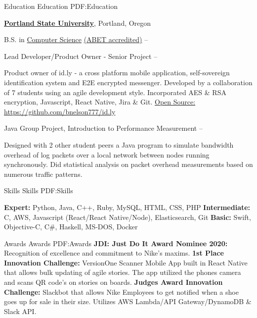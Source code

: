 \documentclass[letterpaper,MMMyyyy,nonstopmode]{simpleresumecv}
\begin{document}
\begin{Body}
		
		
		\Section
		{Education}
		{Education}
		{PDF:Education}
		
		\Entry
		\href{https://www.pdx.edu}
		{\textbf{Portland State University}},
		Portland, Oregon
		
		\Gap
		\BulletItem
		B.S. in
		\href{https://www.pdx.edu/computer-science/}
		{Computer Science} \href{https://www.abet.org}{(ABET accredited)}
		\hfill
		 --
		
		\Gap
		\BulletItem
		Lead Developer/Product Owner - Senior Project 
		\hfill
		 --
		\begin{Detail}
			\SubBulletItem
			Product owner of id.ly - a cross platform mobile application, self-sovereign identification system and E2E encrypted messenger. 
			Developed by a collaboration of 7 students using an agile development style. Incorporated AES \& RSA encryption, Javascript, React Native, Jira \& Git.
			\SubBulletItem
			\href{https://github.com/bnelson777/id.ly}
			{Open Source: https://github.com/bnelson777/id.ly}
		\end{Detail}
		
		\Gap
		\BulletItem
		Java Group Project, Introduction to Performance Measurement
		\hfill
		\DatestampYMD{2017}{04}{15} --
		\DatestampYMD{2017}{06}{15}
		\begin{Detail}
			\SubBulletItem
			Designed with 2 other student peers a Java program to simulate bandwidth overhead of log packets over a local network between nodes running synchronously.
			\SubBulletItem
			Did statistical analysis on packet overhead measurements based on numerous traffic patterns.
		\end{Detail}
		
		
		
		
		\Section
		{Skills}
		{Skills}
		{PDF:Skills}
		
		\Entry
		\textbf{Expert:}
		Python, Java, C++, Ruby, MySQL, HTML, CSS, PHP
		\Entry
		\textbf{Intermediate:}
		C, AWS, Javascript (React/React Native/Node), Elasticsearch, Git
		\Entry
		\textbf{Basic:}
		Swift, Objective-C, C\#, Haskell, MS-DOS, Docker
		
		\Section
		{Awards}
		{Awards}
		{PDF:Awards}
		\Entry
\textbf{JDI: Just Do It Award Nominee 2020:}
Recognition of excellence and commitment to Nike’s maxims.
\Entry
\textbf{1st Place Innovation Challenge:}
VersionOne Scanner Mobile App built in React Native that allows bulk updating of agile stories. The app utilized the phones camera and scans QR code’s on stories on boards.
\Entry
\textbf{Judges Award Innovation Challenge:}
Slackbot that allows Nike Employees to get notified when a shoe goes up for sale in their size. Utilizes AWS Lambda/API Gateway/DynamoDB \& Slack API.
		

\end{Body}
\end{document}
